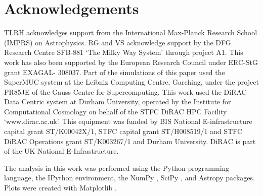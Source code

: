 \documentclass[a4paper,fleqn,usenatbib]{mnras}
\begin{document}
\section*{Acknowledgements}
TLRH acknowledges support from the International Max-Planck Research School (IMPRS) on Astrophysics.
RG and VS acknowledge support by the DFG Research Centre SFB-881 `The
Milky Way System' through project A1. This work has also been
supported by the European Research Council under ERC-StG grant
EXAGAL- 308037. Part of the simulations of this paper used the
SuperMUC system at the Leibniz Computing Centre, Garching,
under the project PR85JE of the Gauss Centre for Supercomputing.
This work used the DiRAC Data Centric system at Durham
University, operated by the Institute for Computational Cosmology
on behalf of the STFC DiRAC HPC Facility `www.dirac.ac.uk'.
This equipment was funded by BIS National E-infrastructure capital
grant ST/K00042X/1, STFC capital grant ST/H008519/1 and
STFC DiRAC Operations grant ST/K003267/1 and Durham University.
DiRAC is part of the UK National E-Infrastructure.


The analysis in this work was performed using the Python \citep{python}
programming language, the IPython \citep{2007CSE.....9c..21P} environment, 
the NumPy \citep{2011CSE....13b..22V}, SciPy \citep{scipy}, and Astropy 
\citep{2013A&A...558A..33A} packages. Plots were created with
Matplotlib \citep{2007CSE.....9...90H}.







 



\end{document}

